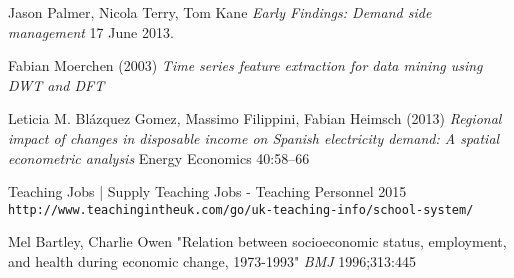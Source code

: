 \documentclass[12pt,a4paper]{report}
\begin{document}
\begin{thebibliography}{9}
Jason Palmer, Nicola Terry, Tom Kane \textit{Early Findings: Demand side management} 17 June 2013.

 Fabian Moerchen (2003) \textit{Time series feature extraction for data mining using DWT and DFT}

 Leticia M. Blázquez Gomez, Massimo Filippini, Fabian Heimsch (2013) \textit{Regional impact of changes in disposable income on Spanish electricity demand: A spatial econometric analysis} Energy Economics 40:58–66

 Teaching Jobs | Supply Teaching Jobs - Teaching Personnel 2015 \texttt{http://www.teachingintheuk.com/go/uk-teaching-info/school-system/}

 Mel Bartley, Charlie Owen "Relation between socioeconomic status, employment, and health during economic change, 1973-1993" \textit{BMJ} 1996;313:445

\end{thebibliography}
\end{document}
